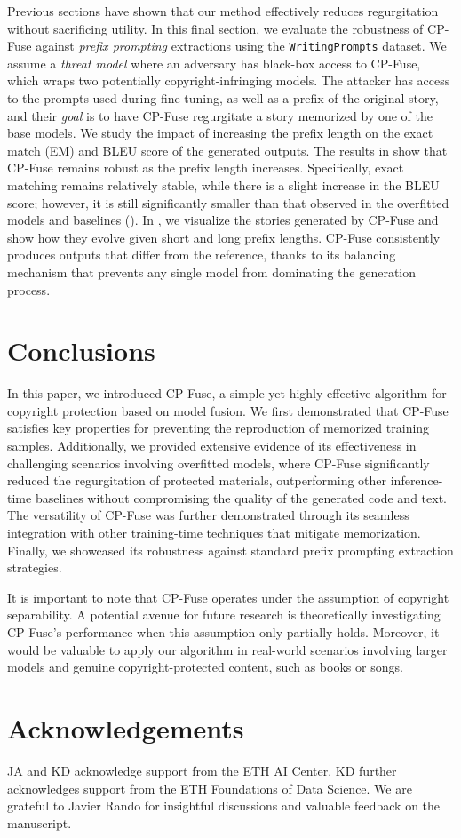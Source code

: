 Previous sections have shown that our method effectively reduces regurgitation without sacrificing utility. In this final section, we evaluate the robustness of CP-Fuse against \textit{prefix prompting} extractions using the \texttt{WritingPrompts} dataset. We assume a \textit{threat model} where an adversary has black-box access to CP-Fuse, which wraps two potentially copyright-infringing models. The attacker has access to the prompts used during fine-tuning, as well as a prefix of the original story, and their \textit{goal} is to have CP-Fuse regurgitate a story memorized by one of the base models. We study the impact of increasing the prefix length on the exact match (EM) and BLEU score of the generated outputs. The results in  show that CP-Fuse remains robust as the prefix length increases. Specifically, exact matching remains relatively stable, while there is a slight increase in the BLEU score; however, it is still significantly smaller than that observed in the overfitted models and baselines (). In , we visualize the stories generated by CP-Fuse and show how they evolve given short and long prefix lengths. CP-Fuse consistently produces outputs that differ from the reference, thanks to its balancing mechanism that prevents any single model from dominating the generation process.






\section{Conclusions}

In this paper, we introduced CP-Fuse, a simple yet highly effective algorithm for copyright protection based on model fusion. We first demonstrated that CP-Fuse satisfies key properties for preventing the reproduction of memorized training samples. Additionally, we provided extensive evidence of its effectiveness in challenging scenarios involving overfitted models, where CP-Fuse significantly reduced the regurgitation of protected materials, outperforming other inference-time baselines without compromising the quality of the generated code and text. The versatility of CP-Fuse was further demonstrated through its seamless integration with other training-time techniques that mitigate memorization. Finally, we showcased its robustness against standard prefix prompting extraction strategies.

It is important to note that CP-Fuse operates under the assumption of copyright separability. A potential avenue for future research is theoretically investigating CP-Fuse’s performance when this assumption only partially holds. Moreover, it would be valuable to apply our algorithm in real-world scenarios involving larger models and genuine copyright-protected content, such as books or songs.





\section*{Acknowledgements}

JA and KD acknowledge support from the ETH AI Center. KD further acknowledges support from the ETH Foundations of Data Science. We are grateful to Javier Rando for insightful discussions and valuable feedback on the manuscript.


